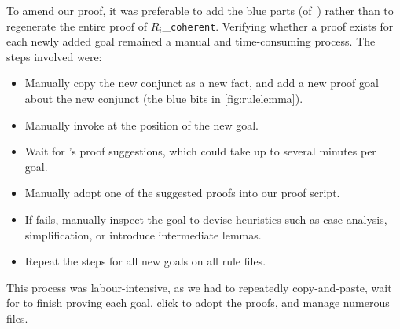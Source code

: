 \documentclass[10pt,conference]{IEEEtran}
\begin{document}
To amend our proof, it was preferable to add the blue parts (of~) rather than to regenerate the entire proof of $R_i$\_\texttt{coherent}.
Verifying whether a proof exists for each newly added goal remained a manual and time-consuming process. The steps involved were:
\begin{itemize}
    \item Manually copy the new conjunct as a new fact, and add a new proof goal about the new conjunct (the blue bits in \cref{fig:rulelemma}).
    \item Manually invoke \sledgehammer{} at the position of the new goal.
    \item Wait for \sledgehammer{}'s proof suggestions, which could take up to several minutes per goal.
    \item Manually adopt one of the suggested proofs into our proof script.
    \item If \sledgehammer{} fails, manually inspect the goal to devise heuristics such as case analysis, simplification, or introduce intermediate lemmas.
    \item Repeat the steps for all new goals on all rule files.
\end{itemize}
\noindent This process was labour-intensive, as we had to repeatedly copy-and-paste, wait for \sledgehammer{} to finish proving each goal, click to adopt the proofs, and manage numerous files.
\end{document}
